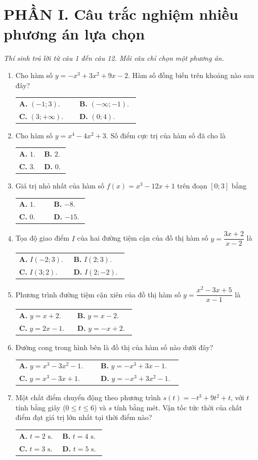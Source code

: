 \documentclass[12pt,a4paper]{article}
\makeatletter
\newcommand{\bonpa}[4]{\par\nobreak\smallskip\nobreak\noindent
\begin{tabular}{@{}p{0.47\linewidth}p{0.47\linewidth}@{}}
\textbf{A.} #1 & \textbf{B.} #2\\[8pt]
\textbf{C.} #3 & \textbf{D.} #4\end{tabular}}
\makeatother
\begin{document}
\section*{\large PHẦN I. Câu trắc nghiệm nhiều phương án lựa chọn}
\textit{Thí sinh trả lời từ câu 1 đến câu 12. Mỗi câu chỉ chọn một phương án.}
\begin{enumerate}
\item Cho hàm số $y=-x^3+3x^2+9x-2$. Hàm số đồng biến trên khoảng nào sau đây?
\bonpa{$(-1;3)$.}{$(-\infty;-1)$.}{$(3;+\infty)$.}{$(0;4)$.}

\item Cho hàm số $y=x^4-4x^2+3$. Số điểm cực trị của hàm số đã cho là
\bonpa{$1$.}{$2$.}{$3$.}{$0$.}

\item Giá trị nhỏ nhất của hàm số $f(x)=x^3-12x+1$ trên đoạn $[0;3]$ bằng
\bonpa{$1$.}{$-8$.}{$0$.}{$-15$.}

\item Tọa độ giao điểm $I$ của hai đường tiệm cận của đồ thị hàm số $y=\dfrac{3x+2}{x-2}$ là
\bonpa{$I(-2;3)$.}{$I(2;3)$.}{$I(3;2)$.}{$I(2;-2)$.}

\item Phương trình đường tiệm cận xiên của đồ thị hàm số $y=\dfrac{x^2-3x+5}{x-1}$ là
\bonpa{$y=x+2$.}{$y=x-2$.}{$y=2x-1$.}{$y=-x+2$.}

\item Đường cong trong hình bên là đồ thị của hàm số nào dưới đây?
\par\nobreak\smallskip
\begin{minipage}[c]{0.60\linewidth}
\bonpa{$y=x^3-3x^2-1$.}{$y=-x^3+3x-1$.}{$y=x^3-3x+1$.}{$y=-x^3+3x^2-1$.}
\end{minipage}\hfill
\begin{minipage}[c]{0.36\linewidth}\centering
{}
\end{minipage}

\item Một chất điểm chuyển động theo phương trình $s(t)=-t^3+9t^2+t$, với $t$ tính bằng giây ($0\le t\le6$) và $s$ tính bằng mét. Vận tốc tức thời của chất điểm đạt giá trị lớn nhất tại thời điểm nào?
\bonpa{$t=2\text{ s}$.}{$t=4\text{ s}$.}{$t=3\text{ s}$.}{$t=5\text{ s}$.}
\end{enumerate}
\end{document}
